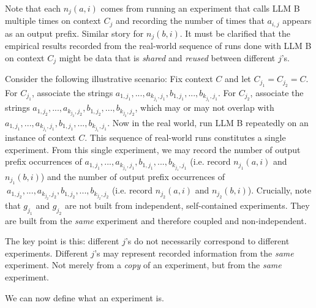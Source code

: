 \documentclass{article}
\begin{document}
Note that each $\displaystyle n_{j}\left( a,i\right)$ comes from running an experiment that calls LLM B multiple times on context $\displaystyle C_{j}$ and recording the number of times that $\displaystyle a_{i,j}$ appears as an output prefix. Similar story for $\displaystyle n_{j}\left( b,i\right)$. It must be clarified that the empirical results recorded from the real-world sequence of runs done with LLM B on context $\displaystyle C_{j}$ might be data that is \textit{shared} and \textit{reused} between different $\displaystyle j$'s.



Consider the following illustrative scenario: Fix context $\displaystyle C$ and let $\displaystyle C_{j_{1}} =C_{j_{2}} =C$. For $\displaystyle C_{j_{1}}$, associate the strings $\displaystyle a_{1,j_{1}} ,...,a_{k_{j_{1}} ,j_{1}} ,b_{1,j_{1}} ,...,b_{k_{j_{1}} ,j_{1}}$. For $\displaystyle C_{j_{2}}$, associate the strings $\displaystyle a_{1,j_{2}} ,...,a_{k_{j_{2}} ,j_{2}} ,b_{1,j_{2}} ,...,b_{k_{j_{2}} ,j_{2}}$, which may or may not overlap with $\displaystyle a_{1,j_{1}} ,...,a_{k_{j_{1}} ,j_{1}} ,b_{1,j_{1}} ,...,b_{k_{j_{1}} ,j_{1}}$. Now in the real world, run LLM B repeatedly on an instance of context $\displaystyle C$. This sequence of real-world runs constitutes a single experiment. From this single experiment, we may record the number of output prefix occurrences of $\displaystyle a_{1,j_{1}} ,...,a_{k_{j_{1}} ,j_{1}} ,b_{1,j_{1}} ,...,b_{k_{j_{1}} ,j_{1}}$ (i.e. record $\displaystyle n_{j_{1}}\left( a,i\right)$ and $\displaystyle n_{j_{1}}\left( b,i\right)$) and the number of output prefix occurrences of $\displaystyle \ a_{1,j_{2}} ,...,a_{k_{j_{2}} ,j_{2}} ,b_{1,j_{2}} ,...,b_{k_{j_{2}} ,j_{2}}$ (i.e. record $\displaystyle n_{j_{2}}\left( a,i\right)$ and $\displaystyle n_{j_{2}}\left( b,i\right)$). Crucially, note that $\displaystyle g_{j_{1}}$ and $\displaystyle g_{j_{2}}$ are not built from independent, self-contained experiments. They are built from the \textit{same} experiment and therefore coupled and non-independent.



The key point is this: different $\displaystyle j$'s do not necessarily correspond to different experiments. Different $\displaystyle j$'s may represent recorded information from the \textit{same} experiment. Not merely from a\textit{ copy} of an experiment, but from the \textit{same} experiment.



We can now define what an experiment is.
\end{document}
